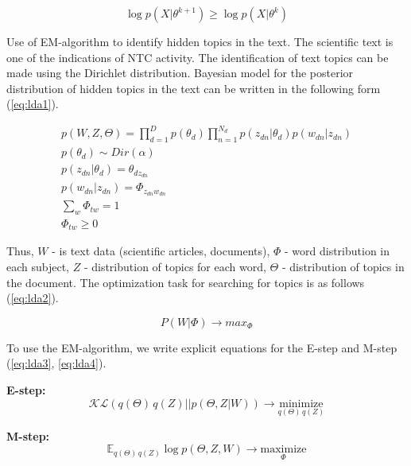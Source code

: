 \documentclass[12pt]{report}
\theoremstyle{definition}
\begin{document}
\begin{equation} \label{eq:em9}
\log p \left( X \vert  \theta ^{k+1} \right) \geqslant \log p \left( X \vert  \theta ^{k} \right)
\end{equation}

Use of EM-algorithm to identify hidden topics in the text.
The scientific text is one of the indications of NTC activity. 
The identification of text topics can be made using the Dirichlet distribution. 
Bayesian model for the posterior distribution of hidden topics in the text can be written in the following form (\ref{eq:lda1}).

\begin{eqnarray} \label{eq:lda1}
	p \left( W,Z,\Theta \right) = \prod_{d=1}^{D} p \left( \theta_d \right) \prod_{n=1}^{N_d} p \left( z_{dn} \vert \theta_d \right) p \left( w_{dn} \vert z_{dn} \right) \\
	p \left( \theta_d \right) \sim Dir \left( \alpha \right) \\
	p \left( z_{dn} \vert \theta_d \right) = \theta_{dz_{dn}} \\
	p \left( w_{dn} \vert z_{dn} \right) = \Phi_{z_{dn}w_{dn}} \\
	\sum_w \Phi_{tw} = 1 \\
	\Phi_{tw} \geqslant 0
\end{eqnarray}

Thus, $W$ - is text data (scientific articles, documents), $\Phi$ - word distribution in each subject, $Z$ - distribution of topics for each word, $\Theta$ - distribution of topics in the document.
The optimization task for searching for topics is as follows (\ref{eq:lda2}).

\begin{equation} \label{eq:lda2}
P \left( W \vert \Phi \right) \rightarrow max_\Phi
\end{equation}

To use the EM-algorithm, we write explicit equations for the E-step and M-step (\ref{eq:lda3}, \ref{eq:lda4}).

\textbf{E-step:}
\begin{equation}\label{eq:lda3}
\mathcal{KL} \left( q \left( \Theta \right)  \, q \left( Z \right)  \vert \vert p \left( \Theta,Z \vert W \right)  \right)  \rightarrow \underset{q \left( \Theta \right)  \, q \left( Z \right) } {\text{minimize}}
\end{equation}

\textbf{M-step:}
\begin{equation}\label{eq:lda4}
\mathbb{E}_{q \left( \Theta \right)  \, q \left( Z \right) } \log p \left( \Theta,Z,W \right)  \rightarrow \underset{\Phi}{\text{maximize}}
\end{equation}
\end{document}
